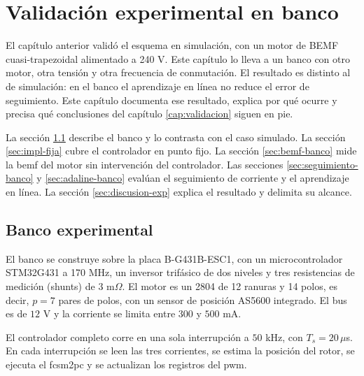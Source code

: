 \documentclass[../../../Tesis_JALS_Maestria.tex]{subfiles}
\begin{document}
\providecommand{\pend}[1]{\textcolor{red}{[#1]}}

\chapter{Validación experimental en banco}
\label{cap:experimental}

El capítulo anterior validó el esquema en simulación, con un motor de BEMF cuasi-trapezoidal alimentado a 240 V. Este capítulo lo lleva a un banco con otro motor, otra tensión y otra frecuencia de conmutación. El resultado es distinto al de simulación: en el banco el aprendizaje en línea no reduce el error de seguimiento. Este capítulo documenta ese resultado, explica por qué ocurre y precisa qué conclusiones del capítulo \ref{cap:validacion} siguen en pie.

La sección \ref{sec:banco} describe el banco y lo contrasta con el caso simulado. La sección \ref{sec:impl-fija} cubre el controlador en punto fijo. La sección \ref{sec:bemf-banco} mide la \acrshort{bemf} del motor sin intervención del controlador. Las secciones \ref{sec:seguimiento-banco} y \ref{sec:adaline-banco} evalúan el seguimiento de corriente y el aprendizaje en línea. La sección \ref{sec:discusion-exp} explica el resultado y delimita su alcance.

\section{Banco experimental}
\label{sec:banco}

El banco se construye sobre la placa B-G431B-ESC1, con un microcontrolador STM32G431 a 170 MHz, un inversor trifásico de dos niveles y tres resistencias de medición (shunts) de $3$ m$\Omega$. El motor es un 2804 de 12 ranuras y 14 polos, es decir, $p = 7$ pares de polos, con un sensor de posición AS5600 integrado. El bus es de $12$ V y la corriente se limita entre $300$ y $500$ mA.

El controlador completo corre en una sola interrupción a $50$ kHz, con $T_s = 20\,\mu$s. En cada interrupción se leen las tres corrientes, se estima la posición del rotor, se ejecuta el \acrshort{fcsm2pc} y se actualizan los registros del \acrshort{pwm}.
\end{document}
